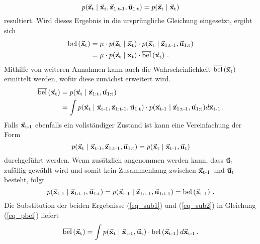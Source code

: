\begin{equation}
p({\vec{\mathbf{z}}_{\text{t}}} \hspace{1mm} \vert \hspace{1mm} {\vec{\mathbf{x}}_{\text{t}},\vec{\mathbf{z}}_{\text{1:t-1}},\vec{\mathbf{u}}_{\text{1:t}}}) = p({\vec{\mathbf{z}}_{\text{t}}} \hspace{1mm} \vert \hspace{1mm} {\vec{\mathbf{x}}_{\text{t}}})
\end{equation}
resultiert. Wird dieses Ergebnis in die ursprüngliche Gleichung eingesetzt, ergibt sich
\begin{equation}
\label{eq_contbayes2}
\begin{split}
\bel{\mVec{x}\idx{t}} &= \mu \cdot \condP{\mVec{z}\idx{t}}{\mVec{x}\idx{t}}\cdot \condP{\mVec{x}\idx{t}}{\mVec{z}\idx{1:t-1},\mVec{u}\idx{1:t}} 
\\
&= \mu \cdot \condP{\mVec{z}\idx{t}}{\mVec{x}\idx{t}}\cdot \pbel{\mVec{x}\idx{t}}\,.
\end{split}
\end{equation}
Mithilfe von weiteren Annahmen kann auch die Wahrscheinlichkeit $\overline{\text{bel}}\left({\vec{\mathbf{x}}_{\text{t}}}\right)$ ermittelt werden, wofür diese zunächst erweitert wird.
\begin{equation}
\label{eq_pbel}
\begin{split}
\pbel{\mVec{x}\idx{t}} &= \condP{\mVec{x}\idx{t}}{\mVec{z}\idx{1:t},\mVec{u}\idx{1:t}}
\\
&= \int \condP{\mVec{x}\idx{t}}{\mVec{x}\idx{t-1},\mVec{z}\idx{1:t-1},\mVec{u}\idx{1:t}}\cdot \condP{\mVec{x}\idx{t-1}}{\mVec{z}\idx{1:t-1},\mVec{u}\idx{1:t}}d\mVec{x}\idx{t-1}\,.
\end{split}
\end{equation}
Falls $\vec{\mathbf{x}}_{\text{t-1}}$ ebenfalls ein vollständiger Zustand ist kann eine Vereinfachung der Form
\begin{equation}
\label{eq_sub1}
\condP{\mVec{x}\idx{t}}{\mVec{x}\idx{t-1},\mVec{z}\idx{1:t-1},\mVec{u}\idx{1:t}}=\condP{\mVec{x}\idx{t}}{\mVec{x}\idx{t-1},\mVec{u}\idx{t}}
\end{equation}
durchgeführt werden. Wenn zusätzlich angenommen werden kann, dass $\vec{\mathbf{u}}_{\text{t}}$ zufällig gewählt wird und somit kein Zusammenhang zwischen $\vec{\mathbf{x}}_{\text{t-1}}$ und $\vec{\mathbf{u}}_{\text{t}}$ besteht, folgt
\begin{equation}
\label{eq_sub2}
\condP{\mVec{x}\idx{t-1}}{\mVec{z}\idx{1:t-1},\mVec{u}\idx{1:t}} = \condP{\mVec{x}\idx{t-1}}{\mVec{z}\idx{1:t-1},\mVec{u}\idx{1:t-1}} = \bel{\mVec{x}\idx{t-1}}\,.
\end{equation}
Die Substitution der beiden Ergebnisse (\ref{eq_sub1}) und (\ref{eq_sub2}) in Gleichung (\ref{eq_pbel}) liefert
\begin{equation}
\label{eq_contbayes1}
\pbel{\mVec{x}\idx{t}} = \int \condP{\mVec{x}\idx{t}}{\mVec{x}\idx{t-1},\mVec{u}\idx{t}}\cdot \bel{\mVec{x}\idx{t-1}}d\mVec{x}\idx{t-1}\,.
\end{equation}
